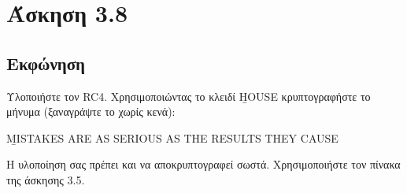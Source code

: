 \section{Άσκηση 3.8}

\subsection{Εκφώνηση}

Υλοποιήστε τον RC4. Χρησιμοποιώντας το κλειδί \b{HOUSE} κρυπτογραφήστε το μήνυμα (ξαναγράψτε το χωρίς κενά):
\begin{center}
    \b{MISTAKES ARE AS SERIOUS AS THE RESULTS THEY CAUSE}
\end{center}

Η υλοποίηση σας πρέπει και να αποκρυπτογραφεί σωστά. Χρησιμοποιήστε τον πίνακα
της άσκησης 3.5.